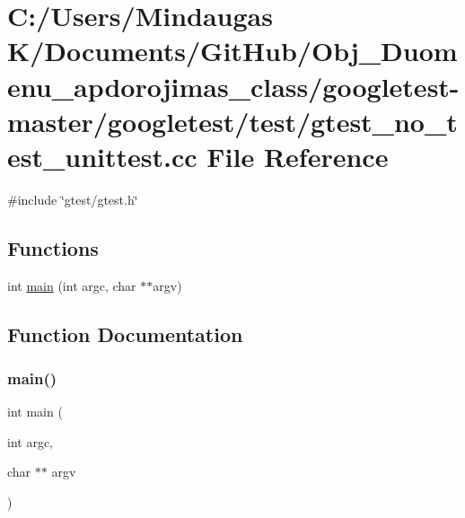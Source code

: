 \hypertarget{googletest-master_2googletest_2test_2gtest__no__test__unittest_8cc}{}\section{C\+:/\+Users/\+Mindaugas K/\+Documents/\+Git\+Hub/\+Obj\+\_\+\+Duomenu\+\_\+apdorojimas\+\_\+class/googletest-\/master/googletest/test/gtest\+\_\+no\+\_\+test\+\_\+unittest.cc File Reference}
\label{googletest-master_2googletest_2test_2gtest__no__test__unittest_8cc}
{\ttfamily \#include \char`\"{}gtest/gtest.\+h\char`\"{}}\newline
\subsection*{Functions}
\begin{DoxyCompactItemize}
\item 
int \mbox{\hyperlink{googletest-master_2googletest_2test_2gtest__no__test__unittest_8cc_a3c04138a5bfe5d72780bb7e82a18e627}{main}} (int argc, char $\ast$$\ast$argv)
\end{DoxyCompactItemize}


\subsection{Function Documentation}
\mbox{\label{googletest-master_2googletest_2test_2gtest__no__test__unittest_8cc_a3c04138a5bfe5d72780bb7e82a18e627}} 
\subsubsection{\texorpdfstring{main()}{main()}}
{\footnotesize\ttfamily int main (\begin{DoxyParamCaption}\item[{int}]{argc,  }\item[{char $\ast$$\ast$}]{argv }\end{DoxyParamCaption})}

